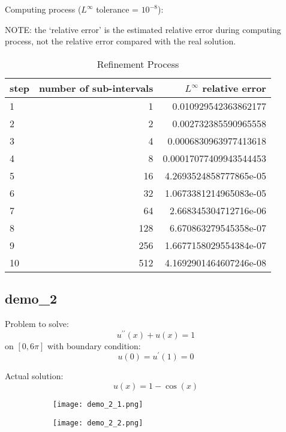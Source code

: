 \documentclass{article}
\begin{document}
Computing process ($L^\infty$ tolerance = $10^{-8}$):

NOTE: the `relative error' is the estimated relative error during 
computing process, not the relative error compared with the real solution.

\begin{table}[H]
    \centering
    \begin{tabular}{l|r|r}
        step & number of sub-intervals & $L^\infty$ relative error \\
        \hline
        1  &   1 & 0.010929542363862177 \\
        2  &   2 & 0.002732385590965558 \\
        3  &   4 & 0.0006830963977413618 \\
        4  &   8 & 0.00017077409943544453 \\
        5  &  16 & 4.2693524858777865e-05 \\
        6  &  32 & 1.0673381214965083e-05 \\
        7  &  64 & 2.668345304712716e-06 \\
        8  & 128 & 6.670863279545358e-07 \\
        9  & 256 & 1.6677158029554384e-07 \\
        10 & 512 & 4.1692901464607246e-08 \\
    \end{tabular}
    \caption{Refinement Process}
\end{table}


\subsection{demo\_2}

Problem to solve:
$$
    u^{\prime\prime}(x) + u(x) = 1
$$ on $[0, 6\pi]$
with boundary condition:
$$
    u(0) = u^\prime(1) = 0
$$

Actual solution:
$$
    u(x) = 1 - \cos(x)
$$

\begin{figure}[H]
	\centering
	\begin{subfigure}[h]{0.45\linewidth}
	    \texttt{[image: demo\_2\_1.png]}
    \end{subfigure}
    \begin{subfigure}[h]{0.45\linewidth}
	    \texttt{[image: demo\_2\_2.png]}
    \end{subfigure}
\end{figure}
\end{document}
